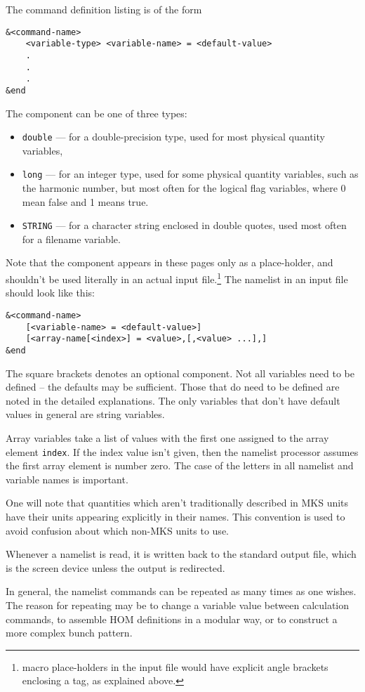 \documentclass[11pt]{article}
\begin{document}
The command definition listing is of the form
\begin{verbatim}
&<command-name>
    <variable-type> <variable-name> = <default-value>
    .
    .
    .
&end
\end{verbatim}
The component {\tt <variable-type>} can be one of three types:
\begin{itemize}
\item {\tt double} --- for a double-precision type, used for most
physical quantity variables,
\item {\tt long} --- for an integer type, used for some physical
    quantity variables, such as the harmonic number, but most often
    for the logical flag variables, where 0 mean false and 1 means
    true.
\item {\tt STRING} --- for a character string enclosed in double
quotes, used most often for a filename variable.
\end{itemize}
Note that the component {\tt <variable-type>} appears in these pages
only as a place-holder, and shouldn't be used literally in an actual input
file.\footnote{macro place-holders in the input file would have explicit angle brackets enclosing a tag, as explained above.}  The namelist in an input file should look like this:
\begin{verbatim}
&<command-name>
    [<variable-name> = <default-value>]
    [<array-name[<index>] = <value>,[,<value> ...],]
&end
\end{verbatim}
The square brackets denotes an optional component. Not all variables
need to be defined -- the defaults may be sufficient.  Those that do
need to be defined are noted in the detailed explanations.  The only
variables that don't have default values in general are string
variables.

Array variables take a list of values with the first one assigned to
the array element {\tt index}.  If the index value isn't given, then the
namelist processor assumes the first array element is number zero.
The case of the letters in all namelist and variable names is
important.

One will note that quantities which aren't traditionally described in
MKS units have their units appearing explicitly in their names.  This
convention is used to avoid confusion about which non-MKS units to
use.

Whenever a namelist is read, it is written back to the standard output
file, which is the screen device unless the output is redirected.

In general, the namelist commands can be repeated as many times as one
wishes. The reason for repeating may be to change a variable value
between calculation commands, to assemble HOM definitions in a modular way,
or to construct a more complex bunch pattern.
\end{document}
